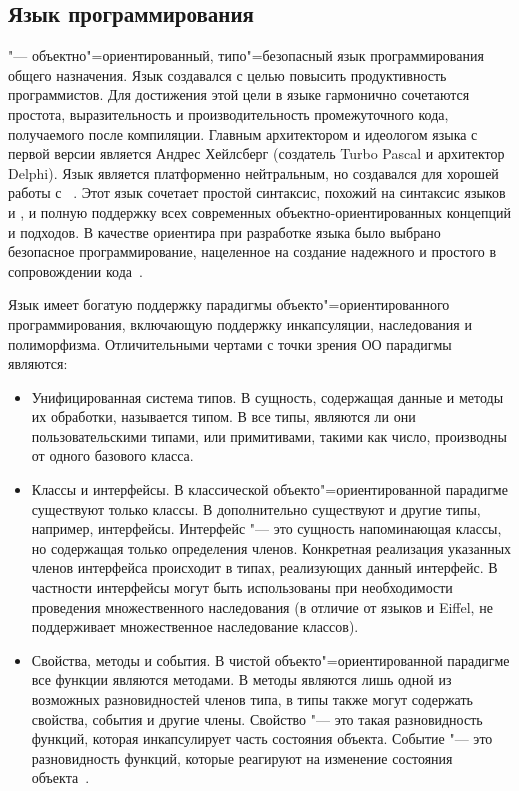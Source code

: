 \subsection{Язык программирования \csharp{}}
\label{sub:practice:csharp_overview}
\csharp{} "--- объектно"=ориентированный, типо"=безопасный язык программирования общего назначения.
Язык создавался с целью повысить продуктивность программистов.
Для достижения этой цели в языке гармонично сочетаются простота, выразительность и производительность промежуточного кода, получаемого после компиляции.
Главным архитектором и идеологом языка с первой версии является Андрес Хейлсберг (создатель Turbo Pascal и архитектор Delphi).
Язык \csharp{} является платформенно нейтральным, но создавался для хорошей работы с \dotnet{}~\cite{albahari_2012_en}.
Этот язык сочетает простой синтаксис, похожий на синтаксис языков \cpp{} и \java{}, и полную поддержку всех современных объектно-ориентированных концепций и подходов. В качестве ориентира при разработке языка было выбрано безопасное программирование, нацеленное на создание надежного и простого в сопровождении кода~\cite{volosevich_cs_2011}.

Язык имеет богатую поддержку парадигмы объекто"=ориентированного программирования, включающую поддержку инкапсуляции, наследования и полиморфизма.
Отличительными чертами \csharp{} с точки зрения ОО парадигмы являются:
\begin{itemize}
  \item Унифицированная система типов. 
        В \csharp{} сущность, содержащая данные и методы их обработки, называется типом.
        В \csharp{} все типы, являются ли они пользовательскими типами, или примитивами, такими как число, производны от одного базового класса.
  \item Классы и интерфейсы.
        В классической объекто"=ориентированной парадигме существуют только классы.
        В \csharp{} дополнительно существуют и другие типы, например, интерфейсы.
        Интерфейс "--- это сущность напоминающая классы, но содержащая только определения членов.
        Конкретная реализация указанных членов интерфейса происходит в типах, реализующих данный интерфейс.
        В частности интерфейсы могут быть использованы при необходимости проведения множественного наследования (в отличие от языков \cpp{} и Eiffel, \csharp{} не поддерживает множественное наследование классов).
  \item Свойства, методы и события.
        В чистой объекто"=ориентированной парадигме все функции являются методами.
        В \csharp{} методы являются лишь одной из возможных разновидностей членов типа, в \csharp{} типы также могут содержать свойства, события и другие члены.
        Свойство "--- это такая разновидность функций, которая инкапсулирует часть состояния объекта.
        Событие "--- это разновидность функций, которые реагируют на изменение состояния объекта~\cite{albahari_2012_en}.
\end{itemize}

